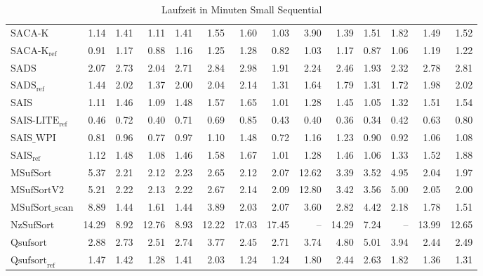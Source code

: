 \begin{table}[h]
{\begin{tabular}{lrrrrrrrrrrrrr}
    $\text{SACA-K}$ & 1.14 & 1.41 & 1.11 & 1.41 & 1.55 & 1.60 & 1.03 & 3.90 & 1.39 & 1.51 & 1.82 & 1.49 & 1.52 \\
    $\text{SACA-K}_{\text{ref}}$ & 0.91 & 1.17 & 0.88 & 1.16 & 1.25 & 1.28 & 0.82 & 1.03 & 1.17 & 0.87 & 1.06 & 1.19 & 1.22 \\
    $\text{SADS}$ & 2.07 & 2.73 & 2.04 & 2.71 & 2.84 & 2.98 & 1.91 & 2.24 & 2.46 & 1.93 & 2.32 & 2.78 & 2.81 \\
    $\text{SADS}_{\text{ref}}$ & 1.44 & 2.02 & 1.37 & 2.00 & 2.04 & 2.14 & 1.31 & 1.64 & 1.79 & 1.31 & 1.72 & 1.98 & 2.02 \\
    $\text{SAIS}$ & 1.11 & 1.46 & 1.09 & 1.48 & 1.57 & 1.65 & 1.01 & 1.28 & 1.45 & 1.05 & 1.32 & 1.51 & 1.54 \\
    $\text{SAIS-LITE}_{\text{ref}}$ & {\color{green!60!black}0.46} & 0.72 & {\color{green!60!black}0.40} & 0.71 & 0.69 & 0.85 & {\color{green!60!black}0.43} & {\color{green!60!black}0.40} & {\color{green!60!black}0.36} & {\color{green!60!black}0.34} & {\color{green!60!black}0.42} & 0.63 & 0.80 \\
    $\text{SAIS\_WPI}$ & 0.81 & 0.96 & 0.77 & 0.97 & 1.10 & 1.48 & 0.72 & 1.16 & 1.23 & 0.90 & 0.92 & 1.06 & 1.08 \\
    $\text{SAIS}_{\text{ref}}$ & 1.12 & 1.48 & 1.08 & 1.46 & 1.58 & 1.67 & 1.01 & 1.28 & 1.46 & 1.06 & 1.33 & 1.52 & 1.88 \\
    $\text{MSufSort}$ & 5.37 & 2.21 & 2.12 & 2.23 & 2.65 & 2.12 & 2.07 & {\color{red}12.62} & 3.39 & 3.52 & 4.95 & 2.04 & 1.97 \\
    $\text{MSufSortV2}$ & 5.21 & 2.22 & 2.13 & 2.22 & 2.67 & 2.14 & 2.09 & {\color{red}12.80} & 3.42 & 3.56 & 5.00 & 2.05 & 2.00 \\
    $\text{MSufSort\_scan}$ & 8.89 & 1.44 & 1.61 & 1.44 & 3.89 & 2.03 & 2.07 & 3.60 & 2.82 & 4.42 & 2.18 & 1.78 & 1.51 \\
    $\text{NzSufSort}$ & {\color{red}14.29} & {\color{red}8.92} & {\color{red}12.76} & {\color{red}8.93} & 12.22 & {\color{red}17.03} & {\color{red}17.45} & {\color{darkgray}--} & 14.29 & 7.24 & {\color{darkgray}--} & {\color{red}13.99} & {\color{red}12.65} \\
    $\text{Qsufsort}$ & 2.88 & 2.73 & 2.51 & 2.74 & 3.77 & 2.45 & 2.71 & 3.74 & 4.80 & 5.01 & 3.94 & 2.44 & 2.49 \\
    $\text{Qsufsort}_{\text{ref}}$ & 1.47 & 1.42 & 1.28 & 1.41 & 2.03 & 1.24 & 1.24 & 1.80 & 2.44 & 2.63 & 1.82 & 1.36 & 1.31 \\
\bottomrule
\end{tabular}
}
\caption{Laufzeit in Minuten Small Sequential}
\label{messung:tab:time-small-seq-none}
\end{table}
